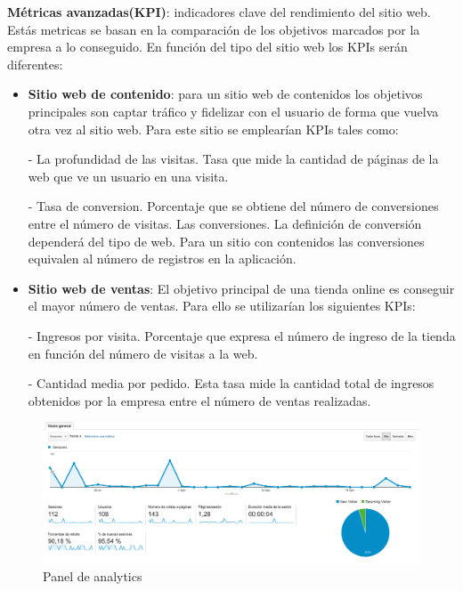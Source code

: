 \vspace{5 mm}

 \textbf{Métricas avanzadas(KPI)}: indicadores clave del rendimiento del sitio web. Estás metricas se basan en la comparación de los objetivos marcados por la empresa a lo conseguido. En función del tipo del sitio web los KPIs serán diferentes:

\begin{itemize}

\item \textbf{Sitio web de contenido}: para un sitio web de contenidos los objetivos principales son captar tráfico y fidelizar con el usuario de forma que vuelva otra vez al sitio web. Para este sitio se emplearían KPIs tales como:

- La profundidad de las visitas. Tasa que mide la cantidad de páginas de la web que ve un usuario en una visita.

- Tasa de conversion. Porcentaje que se obtiene del número de conversiones entre el número de visitas. Las conversiones. La definición de conversión dependerá del tipo de web. Para un sitio con contenidos las conversiones equivalen al número de registros en la aplicación.

\item \textbf{Sitio web de ventas}: El objetivo principal de una tienda online es conseguir el mayor número de ventas. Para ello  se utilizarían los siguientes KPIs:

- Ingresos por visita. Porcentaje que expresa el número de ingreso de la tienda en función del número de visitas a la web.

- Cantidad media por pedido. Esta tasa mide la cantidad total de ingresos obtenidos por la empresa entre el número de ventas realizadas.

\end{itemize}

\begin{figure}
\begin{center}
\includegraphics[width=1.0\textwidth]{imagenes/analytics.png}
\caption{Panel de analytics}
\label{analytics}
\end{center}
\end{figure}

